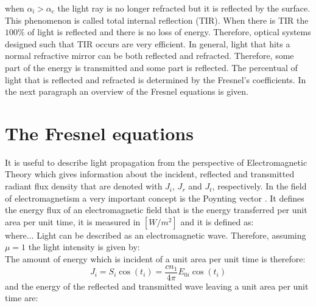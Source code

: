 when $\alpha_{\textrm{i}}>\alpha_{\textrm{c}}$ the light ray is no longer refracted but it is reflected by the surface. This phenomenon is called total internal reflection (TIR). When there is TIR the $100\%$ of light is reflected and there is no loss of energy. Therefore, optical systems designed such that TIR occurs are very efficient. In general, light that hits a normal refractive mirror can be both reflected and refracted. Therefore, some part of the energy is transmitted and some part is reflected. The percentual of light that is reflected and refracted is determined by the Fresnel's coefficients.
In the next paragraph an overview of the Fresnel equations is given.

\section{The Fresnel equations}
It is useful to describe light propagation from the perspective of Electromagnetic Theory which gives information about the incident, reflected and transmitted radiant flux density that are denoted with $J_i$, $J_r$ and $J_t$, respectively. In the field of electromagnetism a very important concept is the Poynting vector . It defines the energy flux of an electromagnetic field that is the energy transferred per unit area per unit time, it is measured in $[W/m^2]$ and it is defined as:
\begin{equation}
\end{equation}
where... 
Light can be described as an electromagnetic wave. Therefore, assuming $\mu = 1$ the light intensity is given by:
\begin{equation}
\end{equation}
The amount of energy which is incident of a unit area per unit time is therefore:
\begin{equation}
J_i = S_i \cos(t_i) = \frac{cn_1}{4\pi}E_{0 i}\cos(t_i)
\end{equation}
and the energy of the reflected and transmitted wave leaving a unit area per unit time are:


